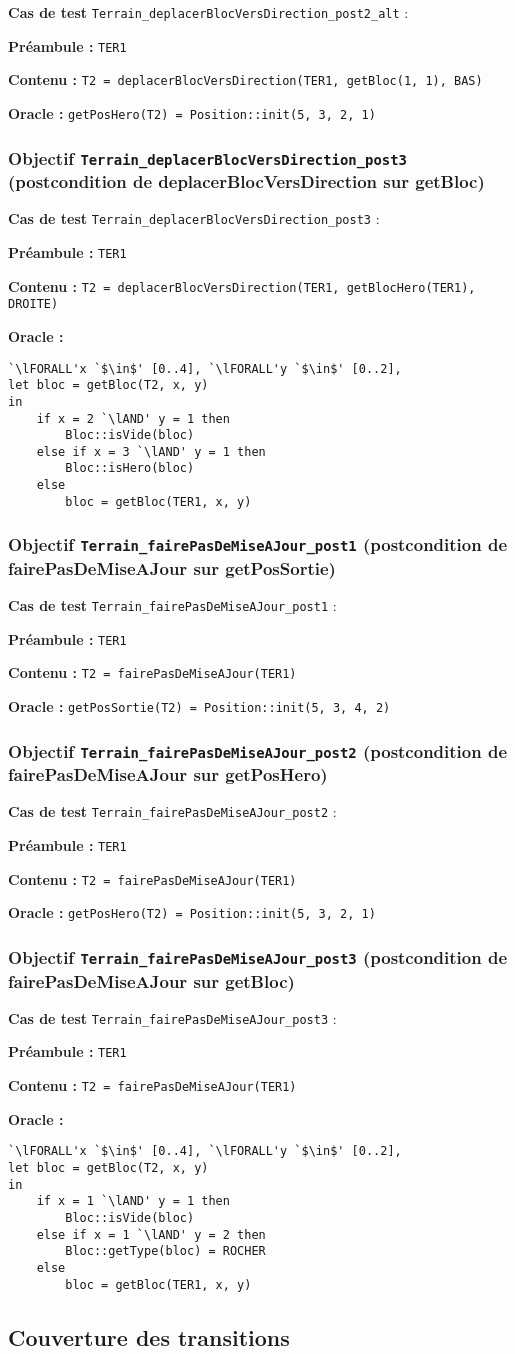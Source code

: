 \documentclass{article}
\newcommand{\cmd}[1]{\texttt{#1}}
\newcommand{\lAND}{$\land$}
\newcommand{\lFORALL}{$\forall$}
\newcommand{\obj}[2]{\subsubsection*{\large{\textbf{Objectif {\cmd{#1} (#2)}}}}}
\newenvironment{cas}[1]
{
	\hspace{1em}\textbf{Cas de test} \cmd{#1} :
	\begin{list}{}{}
}{
	\end{list}\vspace{1em}
}
\newcommand{\pre}[1]{\item \textbf{Préambule :} \cmd{#1}}
\newcommand{\ope}[1]{\item \textbf{Contenu :} \cmd{#1}}
\newcommand{\ora}[1]{\item \textbf{Oracle :} \cmd{#1}}
\newcommand{\oram}{\item \textbf{Oracle :}}
\begin{document}
	\begin{cas} {Terrain\_deplacerBlocVersDirection\_post2\_alt}
		\pre{TER1}
		\ope{T2 = deplacerBlocVersDirection(TER1, getBloc(1, 1), BAS)}
		\ora{getPosHero(T2) = Position::init(5, 3, 2, 1)}
	\end{cas}

\obj{Terrain\_deplacerBlocVersDirection\_post3} {postcondition de deplacerBlocVersDirection sur getBloc}
	\begin{cas} {Terrain\_deplacerBlocVersDirection\_post3}
		\pre{TER1}
		\ope{T2 = deplacerBlocVersDirection(TER1, getBlocHero(TER1), DROITE)}
		\oram{}
		\begin{lstlisting}
`\lFORALL'x `$\in$' [0..4], `\lFORALL'y `$\in$' [0..2],
let bloc = getBloc(T2, x, y)
in
	if x = 2 `\lAND' y = 1 then
		Bloc::isVide(bloc)
	else if x = 3 `\lAND' y = 1 then
		Bloc::isHero(bloc)
	else
		bloc = getBloc(TER1, x, y)
		\end{lstlisting}
	\end{cas}

\obj{Terrain\_fairePasDeMiseAJour\_post1} {postcondition de fairePasDeMiseAJour sur getPosSortie}
	\begin{cas} {Terrain\_fairePasDeMiseAJour\_post1}
		\pre{TER1}
		\ope{T2 = fairePasDeMiseAJour(TER1)}
		\ora{getPosSortie(T2) = Position::init(5, 3, 4, 2)}
	\end{cas}

\obj{Terrain\_fairePasDeMiseAJour\_post2} {postcondition de fairePasDeMiseAJour sur getPosHero}
	\begin{cas} {Terrain\_fairePasDeMiseAJour\_post2}
		\pre{TER1}
		\ope{T2 = fairePasDeMiseAJour(TER1)}
		\ora{getPosHero(T2) = Position::init(5, 3, 2, 1)}
	\end{cas}

\obj{Terrain\_fairePasDeMiseAJour\_post3} {postcondition de fairePasDeMiseAJour sur getBloc}
	\begin{cas} {Terrain\_fairePasDeMiseAJour\_post3}
		\pre{TER1}
		\ope{T2 = fairePasDeMiseAJour(TER1)}
		\oram{}
		\begin{lstlisting}
`\lFORALL'x `$\in$' [0..4], `\lFORALL'y `$\in$' [0..2],
let bloc = getBloc(T2, x, y)
in
	if x = 1 `\lAND' y = 1 then
		Bloc::isVide(bloc)
	else if x = 1 `\lAND' y = 2 then
		Bloc::getType(bloc) = ROCHER
	else
		bloc = getBloc(TER1, x, y)
		\end{lstlisting}
	\end{cas}


\subsection*{Couverture des transitions}
\end{document}
